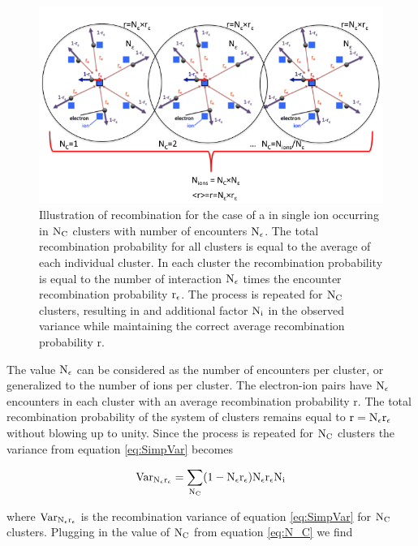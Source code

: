 \renewcommand{\baselinestretch}{1}
\small\normalsize
\begin{figure}[h!]\centering
\includegraphics[width=150mm]{Chapter_Flucs/Figures/Recomb_Flucs/Bino_V_Cluster.png}
\caption{Illustration of recombination for the case of a in single ion occurring in $\rm N_C$ clusters with number of encounters $\rm N_\epsilon$. The total recombination probability for all clusters is equal to the average of each individual cluster. In each cluster the recombination probability is equal to the number of interaction $\rm N_\epsilon$ times the encounter recombination probability $\rm r_\epsilon$. The process is repeated for $\rm N_C$ clusters, resulting in and additional factor $\rm N_i$ in the observed variance while maintaining the correct average recombination probability r. }
\label{fig:Flucs_Fig_Cluster}
\end{figure}
\renewcommand{\baselinestretch}{2}
\small\normalsize

The value $\rm N_\epsilon$ can be considered as the number of encounters per cluster, or generalized to the number of ions per cluster. The electron-ion pairs have $\rm N_\epsilon$ encounters in each cluster with an average recombination probability r. The total recombination probability of the system of clusters remains equal to $\rm r=\rm N_\epsilon r_\epsilon$ without blowing up to unity. Since the process is repeated for $\rm N_C$ clusters the variance from equation \ref{eq:SimpVar} becomes

\begin{equation}
\rm Var_{N_\epsilon r_\epsilon} =  \sum\limits_{N_C}(1-N_\epsilon r_\epsilon)N_\epsilon r_\epsilon N_i
\label{eq:SimpVar_C}
\end{equation}

\noindent where $\rm Var_{N_\epsilon r_\epsilon} $ is the recombination variance of equation \ref{eq:SimpVar} for $\rm N_C$ clusters. Plugging in the value of $\rm N_C$ from equation \ref{eq:N_C} we find

